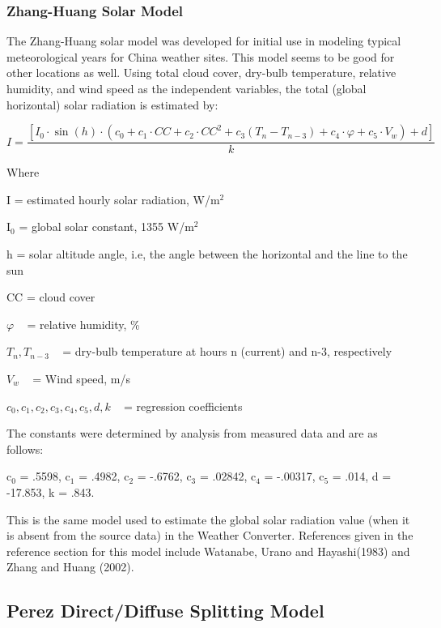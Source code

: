 \subsubsection{Zhang-Huang Solar Model}\label{zhang-huang-solar-model}

The Zhang-Huang solar model was developed for initial use in modeling typical meteorological years for China weather sites. This model seems to be good for other locations as well. Using total cloud cover, dry-bulb temperature, relative humidity, and wind speed as the independent variables, the total (global horizontal) solar radiation is estimated by:

\begin{equation}
I = \frac{{\left[ {{I_0}\cdot \sin (h)\cdot \left( {{c_0} + {c_1}\cdot CC + {c_2}\cdot C{C^2} + {c_3}\left( {{T_n} - {T_{n - 3}}} \right) + {c_4}\cdot \varphi  + {c_5}\cdot {V_w}} \right) + d} \right]}}{k}
\end{equation}

Where

I = estimated hourly solar radiation, W/m\(^{2}\)

I\(_{0}\) = global solar constant, 1355 W/m\(^{2}\)

h = solar altitude angle, i.e, the angle between the horizontal and the line to the sun

CC = cloud cover

\(\varphi\) ~ = relative humidity, \%

\({T_n},{T_{n - 3}}\) ~ = dry-bulb temperature at hours n (current) and n-3, respectively

\({V_w}\) ~ = Wind speed, m/s

\({c_0},{c_1},{c_2},{c_3},{c_4},{c_5},d,k\) ~ = regression coefficients

The constants were determined by analysis from measured data and are as follows:

c\(_{0}\) = .5598, c\(_{1}\) = .4982, c\(_{2}\) = -.6762, c\(_{3}\) = .02842, c\(_{4}\) = -.00317, c\(_{5}\) = .014, d = -17.853, k = .843.

This is the same model used to estimate the global solar radiation value (when it is absent from the source data) in the Weather Converter. References given in the reference section for this model include Watanabe, Urano and Hayashi(1983) and Zhang and Huang (2002).

\subsection{Perez Direct/Diffuse Splitting Model}\label{perez-directdiffuse-splitting-model}

